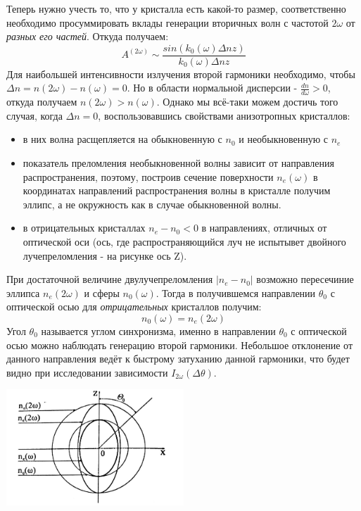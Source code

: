 \documentclass[a4paper,10pt]{extarticle} %
\begin{document}
Теперь нужно учесть то, что у кристалла есть какой-то размер, соответственно необходимо просуммировать вклады генерации вторичных волн с частотой $2 \omega$ от \textit{разных его частей}. Откуда получаем:
\begin{equation}
A^{(2 \omega)} \sim \frac{sin(k_0(\omega) \Delta n z)}{k_0(\omega) \Delta n z}
\end{equation}
Для наибольшей интенсивности излучения второй гармоники необходимо, чтобы $\Delta n = n(2 \omega) - n(\omega) = 0$. Но в области нормальной дисперсии - $\frac{dn}{d \omega} > 0$, откуда получаем $n(2 \omega) > n(\omega)$.
Однако мы всё-таки можем достичь того случая, когда $\Delta n =0$, воспользовавшись свойствами анизотропных кристаллов:
\begin{itemize}
\item в них волна расщепляется на обыкновенную с $n_0$ и необыкновенную с $n_e$
\item показатель преломления необыкновенной волны зависит от направления распространения, поэтому, построив сечение поверхности $n_e(\omega)$ в координатах направлений распространения волны в кристалле получим эллипс, а не окружность как в случае обыкновенной волны.
\item в отрицательных кристаллах $n_e - n_0 < 0$ в направлениях, отличных от оптической оси (ось, где распространяющийся луч не испытывет двойного лучепреломления - на рисунке ось Z).
\end{itemize}

При достаточной величине двулучепреломления $|n_e - n_0|$ возможно пересечиние эллипса $n_e(2 \omega)$ и сферы $n_0(\omega)$. Тогда в получившемся направлении $\theta_0$ с оптической осью для \textit{отрицательных} кристаллов получим:
\begin{equation}
n_0(\omega) = n_e(2 \omega)
\end{equation}
Угол $\theta_0$ называется углом синхронизма, именно в направлении $\theta_0$ с оптической осью можно наблюдать генерацию второй гармоники. Небольшое отклонение от данного направления ведёт к быстрому затуханию данной гармоники, что будет видно при исследовании зависимости $I_{2 \omega} (\Delta \theta)$.

\begin{center}
\includegraphics[width = 0.5\textwidth]{images/ellips}\\
\end{center}
\end{document}
